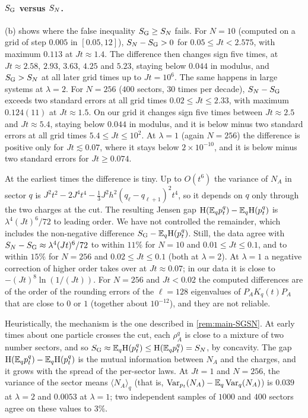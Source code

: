 \paragraph{$S_{\mathrm{G}}$ versus $S_{N}$.}  (b) shows where the false inequality $S_{\mathrm{G}}\ge S_{N}$ fails.  For
$N=10$ (computed on a grid of step $0.005$ in $[0.05,12]$), $S_{N}-S_{\mathrm{G}}>0$ for $0.05\le Jt<2.575$, with maximum $0.113$ at
$Jt\approx1.4$.  The difference then changes sign five times, at $Jt\approx2.58$, $2.93$, $3.63$, $4.25$ and $5.23$,
staying below $0.044$ in modulus, and $S_{\mathrm{G}}>S_{N}$ at all later grid times up to $Jt=10^6$.  The same happens in large systems at $\lambda=2$.  For $N=256$
($400$ sectors, $30$ times per decade), $S_{N}-S_{\mathrm{G}}$ exceeds two standard errors at all grid times
$0.02\le Jt\le2.33$, with maximum $0.124(11)$ at $Jt\approx1.5$.  On our grid it changes sign five times between
$Jt\approx2.5$ and $Jt\approx5.4$, staying below $0.044$ in modulus, and it is below minus two standard errors at all grid times
$5.4\le Jt\le10^2$.  At $\lambda=1$ (again $N=256$) the difference is positive only for $Jt\lesssim0.07$, where it stays
below $2\times10^{-10}$, and it is below minus two standard errors for $Jt\ge0.074$.

At the earliest times the difference is tiny.  Up to $O(t^6)$ the variance of $N_A$ in sector $q$ is
$J^2t^2-2J^4t^4-\frac13J^2h^2(q_\ell-q_{\ell+1})^2t^4$, so it depends on $q$ only through the two charges at the cut.
The resulting Jensen gap $\mathrm{H}(\mathbb{E}_qp^q_t)-\mathbb{E}_q\mathrm{H}(p^q_t)$ is $\lambda^4(Jt)^6/72$ to leading order.  We have not
controlled the remainder, which includes the non-negative difference $S_{\mathrm{G}}-\mathbb{E}_q\mathrm{H}(p^q_t)$.  Still, the data agree with
$S_{N}-S_{\mathrm{G}}\approx\lambda^4(Jt)^6/72$ to within $11\%$ for $N=10$ and $0.01\le Jt\le0.1$, and to within $15\%$ for $N=256$ and
$0.02\le Jt\le0.1$ (both at $\lambda=2$).  At $\lambda=1$ a negative correction of higher order takes over at
$Jt\approx0.07$; in our data it is close to $-(Jt)^8\ln(1/(Jt))$.  For $N=256$ and $Jt<0.02$ the computed differences are
of the order of the rounding errors of the $\ell=128$ eigenvalues of $P_AK_q(t)P_A$ that are close to $0$ or $1$ (together
about $10^{-12}$), and they are not reliable.

Heuristically, the mechanism is the
one described in \cref{rem:main-SGSN}.  At early times about one particle crosses the cut, each $\rho^q_A$ is close to
a mixture of two number sectors, and so $S_{\mathrm{G}}\approx\mathbb{E}_q\mathrm{H}(p^q_t)\le\mathrm{H}(\mathbb{E}_qp^q_t)=S_{N}$, by concavity.  The gap $\mathrm{H}(\mathbb{E}_qp^q_t)-\mathbb{E}_q\mathrm{H}(p^q_t)$ is the mutual information between $N_A$ and the charges, and it
grows with the spread of the per-sector laws.  At $Jt=1$ and $N=256$, the variance of the sector means
$\langle N_A\rangle_q$ (that is, $\operatorname{Var}_{p_t}(N_A)-\mathbb{E}_q\operatorname{Var}_q(N_A)$) is $0.039$ at $\lambda=2$ and $0.0053$ at $\lambda=1$; two
independent samples of $1000$ and $400$ sectors agree on these values to $3\%$.

